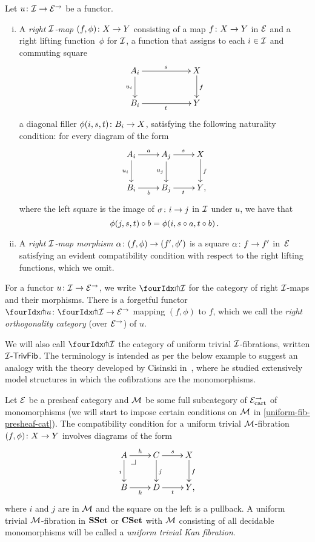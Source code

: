 \documentclass[reqno,10pt,a4paper,oneside,draft]{amsart}
\begin{document}
\begin{definition} \label{def:right-map}
Let $u \co \cal{I} \to \catE^\to$ be a functor.
\begin{enumerate}[(i)]
\item A \emph{right $\cal{I}$-map} $(f, \phi) \co X \to Y$ consisting of a map $f \co X \to Y$ in $\catE$ and a right lifting function~$\phi$ for $\cal{I}$, \ie a function that assigns to each $i \in \cal{I}$ and commuting square
\[
\xymatrix@C=2cm{
  A_i
  \ar[r]^{s}
  \ar[d]_{u_i}
&
  X
  \ar[d]^f
\\
  B_i
  \ar[r]_{t}
&
  Y
}
\]
a diagonal filler $\phi(i,s, t) \co B_i \to X$, satisfying the following naturality condition: for every diagram of the form
\[
\xymatrix{
  A_i
  \ar[r]^{a}
  \ar[d]_{u_i}
&
  A_j
  \ar[r]^{s}
  \ar[d]_{u_j}
&
  X
  \ar[d]^f
\\
  B_i
  \ar[r]_{b}
&
  B_j
  \ar[r]_{t}
&
  Y
\rlap{,}}
\]
where the left square is the image of $\sigma \co i \to j$ in $\cal{I}$ under $u$, we have that
\[
  \phi(j, s, t) \cc b = \phi(i, s \cc a, t \cc b) \, .
\]
\item A \emph{right $\cal{I}$-map morphism} $\alpha \co (f, \phi) \to (f', \phi')$ is a square $\alpha \co f \to f'$ in~$\catE$ satisfying an evident compatibility condition with respect to the right lifting functions, which we omit.
\end{enumerate}
\end{definition}

For a functor $u \co \cal{I} \to \catE^\to$, we write $\liftr{\cal{I}}$ for the category of right $\cal{I}$-maps and their morphisms.
There is a forgetful functor~$\liftr{u} \co \liftr{\cal{I}} \to \catE^\to$ mapping $(f, \phi)$ to $f$, which we call the \emph{right orthogonality category} (over $\catE^\to$) of $u$.

We will also call $\liftr{\cal{I}}$ the category of uniform trivial $\cal{I}$-fibrations, written $\TrivFib{\cal{I}}$.
The terminology is intended as per the below example to suggest an analogy with the theory developed by Cisinski in~\cite{cisinski-asterisque}, where he studied extensively model structures in which the cofibrations are the monomorphisms.

\begin{example} \label{exa-triv-kan-fib}
Let $\catE$ be a presheaf category and $\cal{M}$ be some full subcategory of $\catE_\cart^\to$ of monomorphisms (we will start to impose certain conditions on $\cal{M}$ in \cref{uniform-fib-presheaf-cat}).
The compatibility condition for a uniform trivial $\cal{M}$-fibration $(f, \phi) \co X \to Y$ involves diagrams of the form
\[
\xymatrix{
  A
  \ar[r]^{h}
  \ar[d]_{i}
  \pullback{dr}
&
  C \ar[d]^{j}
  \ar[r]^{s}
&
  X \ar[d]^f
\\
  B
  \ar[r]_{k}
&
  D \ar[r]_{t}
&
  Y
\rlap{,}}
\]
where $i$ and $j$ are in $\cal{M}$ and the square on the left is a pullback.
A uniform trivial $\cal{M}$-fibration in $\SSet$ or $\CSet$ with $\cal{M}$ consisting of all decidable monomorphisms will be called a \emph{uniform trivial Kan fibration}.
\end{example}
\end{document}
